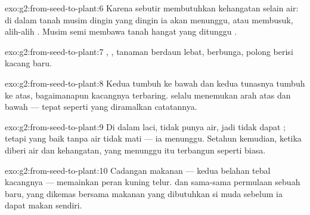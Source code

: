 \begin{solution}{exo:g2:from-seed-to-plant:6}
Karena sebutir  membutuhkan kehangatan selain air: di dalam tanah
musim dingin yang dingin ia akan menunggu, atau membusuk, alih-alih
. Musim semi membawa tanah hangat yang ditunggu .
\end{solution}

\begin{solution}{exo:g2:from-seed-to-plant:7}
, , tanaman berdaun lebat,  berbunga, polong
berisi kacang baru.
\end{solution}

\begin{solution}{exo:g2:from-seed-to-plant:8}
Kedua  tumbuh ke bawah dan kedua tunasnya tumbuh ke atas,
bagaimanapun kacangnya terbaring.  selalu menemukan arah
atas dan bawah --- tepat seperti yang diramalkan catatannya.
\end{solution}

\begin{solution}{exo:g2:from-seed-to-plant:9}
Di dalam laci,  tidak punya air, jadi tidak dapat
; tetapi  yang baik tanpa air tidak mati --- ia
menunggu. Setahun kemudian, ketika diberi air dan kehangatan, 
yang menunggu itu terbangun seperti biasa.
\end{solution}

\begin{solution}{exo:g2:from-seed-to-plant:10}
Cadangan makanan  --- kedua belahan tebal kacangnya ---
memainkan peran kuning telur.  dan  sama-sama permulaan
sebuah  baru, yang dikemas bersama makanan yang
dibutuhkan si muda sebelum ia dapat makan sendiri.
\end{solution}
